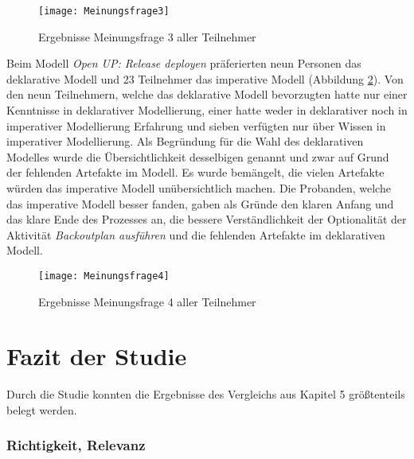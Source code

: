 \begin{figure}[htp]
\begin{center}
  \texttt{[image: Meinungsfrage3]} %
  \caption{Ergebnisse Meinungsfrage 3 aller Teilnehmer}
  \label{fig:Meinungsfrage3}
\end{center}
\end{figure}

Beim Modell \textit{Open UP: Release deployen} präferierten neun Personen das deklarative Modell und 23 Teilnehmer das imperative Modell (Abbildung \ref{fig:Meinungsfrage4}). Von den neun Teilnehmern, welche das deklarative Modell bevorzugten hatte nur einer Kenntnisse in deklarativer Modellierung, einer hatte weder in deklarativer noch in imperativer Modellierung Erfahrung und sieben verfügten nur über Wissen in imperativer Modellierung. \newline
Als Begründung für die Wahl des deklarativen Modelles wurde die Übersichtlichkeit desselbigen genannt und zwar auf Grund der fehlenden Artefakte im Modell. Es wurde bemängelt, die vielen Artefakte würden das imperative Modell unübersichtlich machen.\newline
Die Probanden, welche das imperative Modell besser fanden, gaben als Gründe den klaren Anfang und das klare Ende des Prozesses an, die bessere Verständlichkeit der Optionalität der Aktivität \textit{Backoutplan ausführen} und die fehlenden Artefakte im deklarativen Modell. \newline



\begin{figure}[htp]
\begin{center}
  \texttt{[image: Meinungsfrage4]} %
  \caption{Ergebnisse Meinungsfrage 4 aller Teilnehmer}
  \label{fig:Meinungsfrage4}
\end{center}
\end{figure}


\clearpage

\section{Fazit der Studie}

Durch die Studie konnten die Ergebnisse des Vergleichs aus Kapitel 5 größtenteils belegt werden.\newline

\subsubsection{Richtigkeit, Relevanz}


